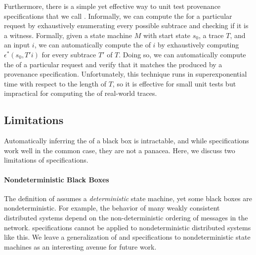 Furthermore, there is a simple yet effective way to unit test provenance
specifications that we call .
Informally, we can compute the \watprovenance{} for a particular request by
exhaustively enumerating every possible subtrace and checking if it is a
witness. Formally, given a state machine $M$ with start state $s_0$, a trace
$T$, and an input $i$, we can automatically compute the \watprovenance{} of $i$
by exhaustively computing $\epsilon^*(s_0, T'i)$ for every subtrace $T'$ of
$T$. Doing so, we can automatically compute the \watprovenance{} of a
particular request and verify that it matches the \watprovenance{} produced by
a provenance specification. Unfortunately, this technique runs in
superexponential time with respect to the length of $T$, so it is effective for
small unit tests but impractical for computing the \watprovenance{} of
real-world traces.

\subsection{Limitations}
Automatically inferring the \watprovenance{} of a black box is intractable, and
while \watprovenance{} specifications work well in the common case, they are
not a panacea. Here, we discuss two limitations of \watprovenance{}
specifications.

\paragraph{Nondeterministic Black Boxes}
The definition of \watprovenance{} assumes a \emph{deterministic} state
machine, yet some black boxes are nondeterministic. For example, the behavior
of many weakly consistent distributed systems depend on the non-deterministic
ordering of messages in the network. \watprovenance{} specifications cannot be
applied to nondeterministic distributed systems like this.  We leave a
generalization of \watprovenance{} and \watprovenance{} specifications to
nondeterministic state machines as an interesting avenue for future work.

